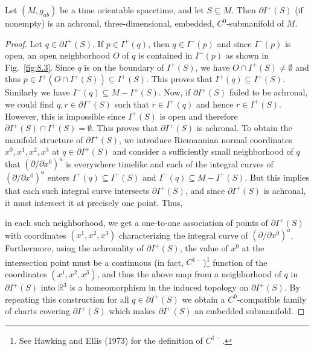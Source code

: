 \begin{theorem}\label{thm:8.1.3}
Let \((M,g_{ab})\) be a time orientable spacetime, and let \(S\subseteq M\). Then
\(\partial I^+(S)\) (if nonempty) is an achronal, three-dimensional, embedded,
\(C^0\)-submanifold of \(M\).
\end{theorem}
\begin{proof}
Let \(q\in\partial I^+(S)\). If \(p\in I^+(q)\), then \(q\in I^-(p)\) and since
\(I^-(p)\) is open, an open neighborhood \(O\) of \(q\) is contained in \(I^-(p)\)
as shown in Fig.~\ref{fig:8.3}. Since \(q\) is on the boundary of \(I^+(S)\), we
have \(O\cap I^+(S)\ne\emptyset\) and thus
\(p\in I^+(O\cap I^+(S))\subseteq I^+(S)\). This proves that
\(I^+(q)\subseteq I^+(S)\). Similarly we have \(I^-(q)\subseteq M-I^+(S)\).
Now, if \(\partial I^+(S)\) failed to be achronal, we could find
\(q,r\in\partial I^+(S)\) such that \(r\in I^+(q)\) and hence
\(r\in I^+(S)\). However, this is impossible since \(I^+(S)\) is open and
therefore \(\partial I^+(S)\cap I^+(S)=\emptyset\). This proves that
\(\partial I^+(S)\) is achronal. To obtain the manifold structure of
\(\partial I^+(S)\), we introduce Riemannian normal coordinates \(x^0,x^1,x^2,x^3\)
at \(q\in\partial I^+(S)\) and consider a sufficiently small neighborhood of \(q\)
that \((\partial/\partial x^0)^a\) is everywhere timelike and each of the integral
curves of \((\partial/\partial x^0)^a\) enters \(I^+(q)\subseteq I^+(S)\) and
\(I^-(q)\subseteq M-I^+(S)\). But this implies that each such integral curve
intersects \(\partial I^+(S)\), and since \(\partial I^+(S)\) is achronal, it must
intersect it at precisely one point. Thus,



in each such neighborhood, we get a one-to-one association of points of
\(\partial I^+(S)\) with coordinates \((x^1,x^2,x^3)\) characterizing the integral
curve of \((\partial/\partial x^0)^a\). Furthermore, using the achronality of
\(\partial I^+(S)\), the value of \(x^0\) at the intersection point must be a
continuous (in fact, \(C^{1-}\))\footnote{See Hawking and Ellis (1973) for the
definition of \(C^{1-}\).} function of the coordinates \((x^1,x^2,x^3)\), and
thus the above map from a neighborhood of \(q\) in \(\partial I^+(S)\) into
\(\mathbb{R}^3\) is a homeomorphism in the induced topology on \(\partial I^+(S)\).
By repeating this construction for all \(q\in\partial I^+(S)\) we obtain a
\(C^0\)-compatible family of charts covering \(\partial I^+(S)\) which makes
\(\partial I^+(S)\) an embedded submanifold.
\end{proof}

